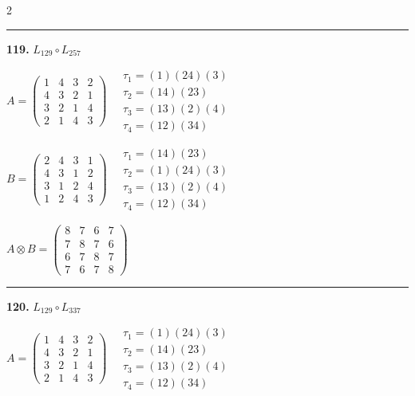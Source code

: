 \begin{multicols}{2}
\vspace{0.3em}
\hrule
\vspace{0.3em}

\noindent\textbf{119.} $L_{129} \circ L_{257}$

$A = \begin{pmatrix} 1 & 4 & 3 & 2 \\ 4 & 3 & 2 & 1 \\ 3 & 2 & 1 & 4 \\ 2 & 1 & 4 & 3 \end{pmatrix} \quad \begin{matrix} \tau_{1}=(1)(2 4)(3) \\ \tau_{2}=(1 4)(2 3) \\ \tau_{3}=(1 3)(2)(4) \\ \tau_{4}=(1 2)(3 4) \end{matrix}$

$B = \begin{pmatrix} 2 & 4 & 3 & 1 \\ 4 & 3 & 1 & 2 \\ 3 & 1 & 2 & 4 \\ 1 & 2 & 4 & 3 \end{pmatrix} \quad \begin{matrix} \tau_{1}=(1 4)(2 3) \\ \tau_{2}=(1)(2 4)(3) \\ \tau_{3}=(1 3)(2)(4) \\ \tau_{4}=(1 2)(3 4) \end{matrix}$

$A \otimes B = \begin{pmatrix} 8 & 7 & 6 & 7 \\ 7 & 8 & 7 & 6 \\ 6 & 7 & 8 & 7 \\ 7 & 6 & 7 & 8 \end{pmatrix}$

\vspace{0.3em}
\hrule
\vspace{0.3em}

\noindent\textbf{120.} $L_{129} \circ L_{337}$

$A = \begin{pmatrix} 1 & 4 & 3 & 2 \\ 4 & 3 & 2 & 1 \\ 3 & 2 & 1 & 4 \\ 2 & 1 & 4 & 3 \end{pmatrix} \quad \begin{matrix} \tau_{1}=(1)(2 4)(3) \\ \tau_{2}=(1 4)(2 3) \\ \tau_{3}=(1 3)(2)(4) \\ \tau_{4}=(1 2)(3 4) \end{matrix}$


\end{multicols}
